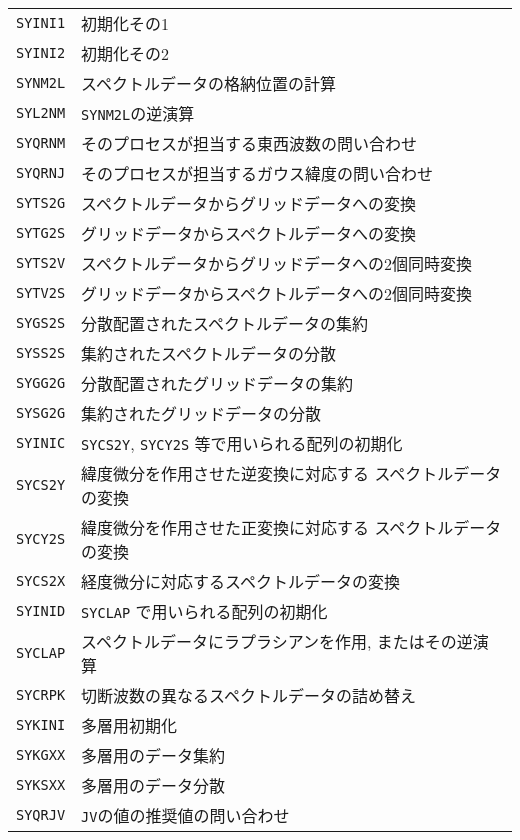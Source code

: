 \documentclass[a4j]{jsarticle}
\begin{document}
\vspace{1em}
\begin{tabular}{ll}
\texttt{SYINI1} & 初期化その1\\
\texttt{SYINI2} & 初期化その2\\  
\texttt{SYNM2L} & スペクトルデータの格納位置の計算\\
\texttt{SYL2NM} & \texttt{SYNM2L}の逆演算\\
\texttt{SYQRNM} & そのプロセスが担当する東西波数の問い合わせ\\
\texttt{SYQRNJ} & そのプロセスが担当するガウス緯度の問い合わせ\\
\texttt{SYTS2G} & スペクトルデータからグリッドデータへの変換\\
\texttt{SYTG2S} & グリッドデータからスペクトルデータへの変換\\
\texttt{SYTS2V} & スペクトルデータからグリッドデータへの2個同時変換\\
\texttt{SYTV2S} & グリッドデータからスペクトルデータへの2個同時変換\\
\texttt{SYGS2S} & 分散配置されたスペクトルデータの集約\\
\texttt{SYSS2S} & 集約されたスペクトルデータの分散\\
\texttt{SYGG2G} & 分散配置されたグリッドデータの集約\\
\texttt{SYSG2G} & 集約されたグリッドデータの分散\\
\texttt{SYINIC} & \texttt{SYCS2Y}, \texttt{SYCY2S} 等で用いられる配列の初期化\\
\texttt{SYCS2Y} & 緯度微分を作用させた逆変換に対応する
スペクトルデータの変換\\
\texttt{SYCY2S} & 緯度微分を作用させた正変換に対応する
スペクトルデータの変換\\
\texttt{SYCS2X} & 経度微分に対応するスペクトルデータの変換\\
\texttt{SYINID} & \texttt{SYCLAP} で用いられる配列の初期化\\
\texttt{SYCLAP} & スペクトルデータにラプラシアンを作用, またはその逆演算\\
\texttt{SYCRPK} & 切断波数の異なるスペクトルデータの詰め替え\\
\texttt{SYKINI} & 多層用初期化\\
\texttt{SYKGXX} & 多層用のデータ集約\\
\texttt{SYKSXX} & 多層用のデータ分散\\
\texttt{SYQRJV} & \texttt{JV}の値の推奨値の問い合わせ
\end{tabular}
\end{document}
